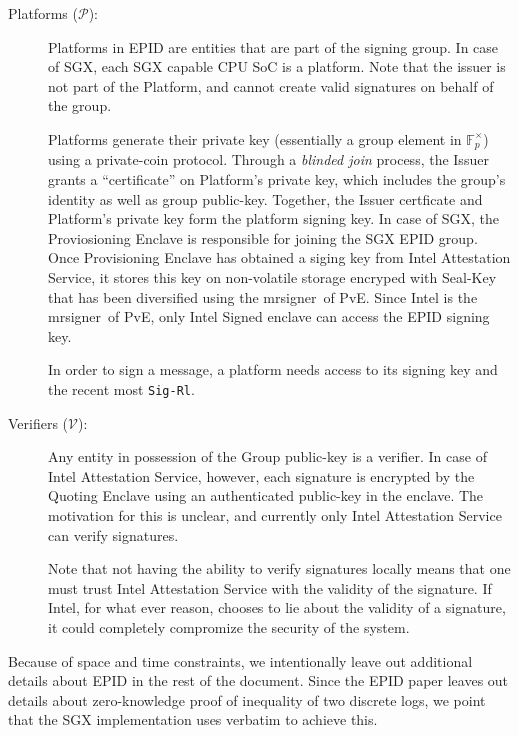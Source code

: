 \documentclass[10pt, letterpaper]{article}
\newcommand{\mrsigner}{\textsf{mrsigner}}
\newcommand{\pve}{\textsf{PvE}}
\begin{document}
\begin{description}
    \item[Platforms ($\mathcal{P}$):] Platforms in EPID are entities
      that are part of the signing group. In case of SGX, each SGX
      capable CPU SoC is a platform. Note that the issuer is not part
      of the Platform, and cannot create valid signatures on behalf of
      the group.

      Platforms generate their private key (essentially a group
      element in $\mathbb{F}_p^{\times}$) using a private-coin
      protocol. Through a \textit{blinded join} process, the Issuer
      grants a ``certificate'' on Platform's private key, which
      includes the group's identity as well as group
      public-key. Together, the Issuer certficate and Platform's
      private key form the platform signing key. In case of SGX, the
      Proviosioning Enclave is responsible for joining the SGX EPID
      group. Once Provisioning Enclave has obtained a siging key from
      Intel Attestation Service, it stores this key on non-volatile
      storage encryped with Seal-Key that has been diversified using
      the \mrsigner\ of \pve. Since Intel is the \mrsigner\ of \pve,
      only Intel Signed enclave can access the EPID signing key.

      In order to sign a message, a platform needs access to its
      signing key and the recent most \texttt{Sig-Rl}.

    \item [Verifiers ($\mathcal{V}$):] Any entity in possession of the
      Group public-key is a verifier. In case of Intel Attestation
      Service, however, each signature is encrypted by the
      \textsf{Quoting Enclave} using an authenticated public-key in
      the enclave. The motivation for this is unclear, and currently
      only Intel Attestation Service can verify signatures.

      Note that not having the ability to verify signatures locally
      means that one must trust Intel Attestation Service with the
      validity of the signature. If Intel, for what ever reason,
      chooses to lie about the validity of a signature, it could
      completely compromize the security of the system.
  \end{description}

  Because of space and time constraints, we intentionally leave out
  additional details about EPID in the rest of the document. Since the
  EPID paper leaves out details about zero-knowledge proof of
  inequality of two discrete logs, we point that the SGX
  implementation uses \cite[\S6]{ShoupVFE} verbatim to achieve this.
\end{document}
